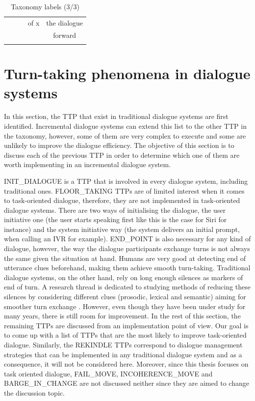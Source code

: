 \begin{table}[htp]
{\begin{tabular}{|c|c|c|c|c|}
                & & & of x & the dialogue \\
                & & & & forward \\
                & & & & \\
                \hline
       		\end{tabular}
       	}
        \caption{Taxonomy labels (3/3)}
        \label{tab:taxosynth3}
	\end{table}
		
	 \section{Turn-taking phenomena in dialogue systems}

                                In this section, the TTP that exist in traditional dialogue systems are first identified. Incremental dialogue systems can extend this list to the other TTP in the taxonomy, however, some of them are very complex to execute and some are unlikely to improve the dialogue efficiency. The objective of this section is to discuss each of the previous TTP in order to determine which one of them are worth implementing in an incremental dialogue system.
	
				INIT\_DIALOGUE is a TTP that is involved in every dialogue system, including traditional ones. FLOOR\_TAKING TTPs are of limited interest when it comes to task-oriented dialogue, therefore, they are not implemented in task-oriented dialogue systems. There are two ways of initialising the dialogue, the user initiative one (the user starts speaking first like this is the case for Siri for instance) and the system initiative way (the system delivers an initial prompt, when calling an IVR for example). END\_POINT is also necessary for any kind of dialogue, however, the way the dialogue participants exchange turns is not always the same given the situation at hand. Humans are very good at detecting end of utterance clues beforehand, making them achieve smooth turn-taking. Traditional dialogue systems, on the other hand, rely on long enough silences as markers of end of turn. A research thread is dedicated to studying methods of reducing these silences by considering different clues (prosodic, lexical and semantic) aiming for smoother turn exchange \cite{Raux2008,Gravano2011}. However, even though they have been under study for many years, there is still room for improvement. In the rest of this section, the remaining TTPs are discussed from an implementation point of view. Our goal is to come up with a list of TTPs that are the most likely to improve task-oriented dialogue. Similarly, the REKINDLE TTPs correspond to dialogue management strategies that can be implemented in any traditional dialogue system and as a consequence, it will not be considered here. Moreover, since this thesis focuses on task oriented dialogue, FAIL\_MOVE, INCOHERENCE\_MOVE and BARGE\_IN\_CHANGE are not discussed neither since they are aimed to change the discussion topic.

